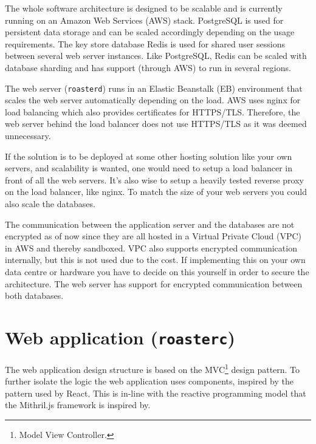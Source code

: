 \documentclass[12pt,a4paper]{report}
\begin{document}
The whole software architecture is designed to be scalable and is currently running on an Amazon Web Services (AWS) stack. PostgreSQL is used for persistent data storage and can be scaled accordingly depending on the usage requirements. The key store database Redis is used for shared user sessions between several web server instances. Like PostgreSQL, Redis can be scaled with database sharding and has support (through AWS) to run in several regions.

The web server (\texttt{roasterd}) runs in an Elastic Beanstalk (EB) environment that scales the web server automatically depending on the load. AWS uses nginx for load balancing which also provides certificates for HTTPS/TLS. Therefore, the web server behind the load balancer does not use HTTPS/TLS as it was deemed unnecessary.

If the solution is to be deployed at some other hosting solution like your own servers, and scalability is wanted, one would need to setup a load balancer in front of all the web servers. It's also wise to setup a heavily tested reverse proxy on the load balancer, like nginx. To match the size of your web servers you could also scale the databases. 

The communication between the application server and the databases are not encrypted as of now since they are all hosted in a Virtual Private Cloud (VPC) in AWS and thereby sandboxed. VPC also supports encrypted communication internally, but this is not used due to the cost. If implementing this on your own data centre or hardware you have to decide on this yourself in order to secure the architecture. The web server has  support for encrypted communication between both databases. 

\section{Web application (\texttt{roasterc})}
The web application design structure is based on the MVC\footnote{Model View Controller.} design pattern. To further isolate the logic the web application uses components, inspired by the pattern used by React\cite{react-component}. This is in-line with the reactive programming model that the Mithril.js framework is inspired by.
\end{document}
